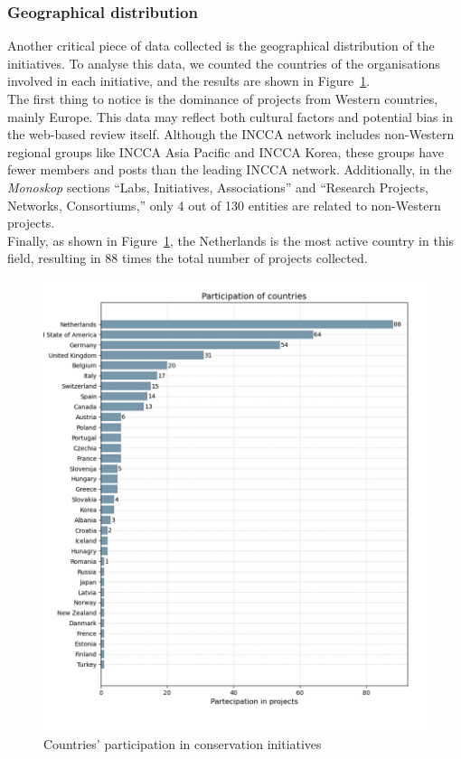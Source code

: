 \subsubsection{Geographical distribution}
Another critical piece of data collected is the geographical distribution of the initiatives. To analyse this data, we counted the countries of the organisations involved in each initiative, and the results are shown in Figure~\ref{fig:c1-geo}.\\
The first thing to notice is the dominance of projects from Western countries, mainly Europe. This data may reflect both cultural factors and potential bias in the web-based review itself. Although the INCCA network includes non-Western regional groups like INCCA Asia Pacific and INCCA Korea, these groups have fewer members and posts than the leading INCCA network. Additionally, in the \textit{Monoskop} sections ``Labs, Initiatives, Associations'' and ``Research Projects, Networks, Consortiums,'' only 4 out of 130 entities are related to non-Western projects.\\
Finally, as shown in Figure~\ref{fig:c1-geo}, the Netherlands is the most active country in this field, resulting in 88 times the total number of projects collected.

\begin{figure}[!h]
    \centering
    \includegraphics[width=\textwidth]{chapters/1-state_of_the_art/image/plot01-countries.png}
    \caption{Countries’ participation in conservation initiatives}
    \label{fig:c1-geo}
\end{figure}


